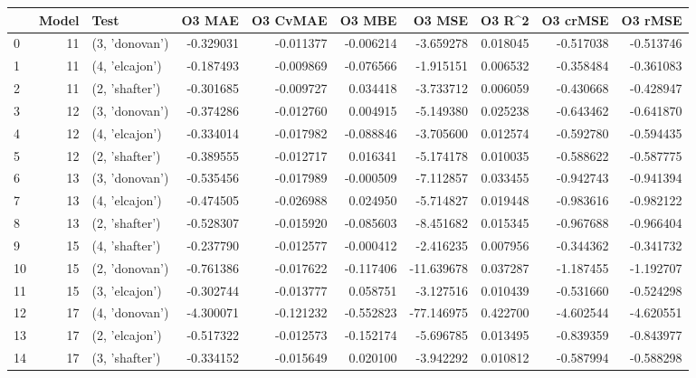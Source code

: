 \begin{tabular}{lrlrrrrrrr}
\toprule
{} &  Model &            Test &    O3 MAE &  O3 CvMAE &    O3 MBE &     O3 MSE &    O3 R\textasciicircum2 &  O3 crMSE &   O3 rMSE \\
\midrule
0  &     11 &  (3, 'donovan') & -0.329031 & -0.011377 & -0.006214 &  -3.659278 &  0.018045 & -0.517038 & -0.513746 \\
1  &     11 &  (4, 'elcajon') & -0.187493 & -0.009869 & -0.076566 &  -1.915151 &  0.006532 & -0.358484 & -0.361083 \\
2  &     11 &  (2, 'shafter') & -0.301685 & -0.009727 &  0.034418 &  -3.733712 &  0.006059 & -0.430668 & -0.428947 \\
3  &     12 &  (3, 'donovan') & -0.374286 & -0.012760 &  0.004915 &  -5.149380 &  0.025238 & -0.643462 & -0.641870 \\
4  &     12 &  (4, 'elcajon') & -0.334014 & -0.017982 & -0.088846 &  -3.705600 &  0.012574 & -0.592780 & -0.594435 \\
5  &     12 &  (2, 'shafter') & -0.389555 & -0.012717 &  0.016341 &  -5.174178 &  0.010035 & -0.588622 & -0.587775 \\
6  &     13 &  (3, 'donovan') & -0.535456 & -0.017989 & -0.000509 &  -7.112857 &  0.033455 & -0.942743 & -0.941394 \\
7  &     13 &  (4, 'elcajon') & -0.474505 & -0.026988 &  0.024950 &  -5.714827 &  0.019448 & -0.983616 & -0.982122 \\
8  &     13 &  (2, 'shafter') & -0.528307 & -0.015920 & -0.085603 &  -8.451682 &  0.015345 & -0.967688 & -0.966404 \\
9  &     15 &  (4, 'shafter') & -0.237790 & -0.012577 & -0.000412 &  -2.416235 &  0.007956 & -0.344362 & -0.341732 \\
10 &     15 &  (2, 'donovan') & -0.761386 & -0.017622 & -0.117406 & -11.639678 &  0.037287 & -1.187455 & -1.192707 \\
11 &     15 &  (3, 'elcajon') & -0.302744 & -0.013777 &  0.058751 &  -3.127516 &  0.010439 & -0.531660 & -0.524298 \\
12 &     17 &  (4, 'donovan') & -4.300071 & -0.121232 & -0.552823 & -77.146975 &  0.422700 & -4.602544 & -4.620551 \\
13 &     17 &  (2, 'elcajon') & -0.517322 & -0.012573 & -0.152174 &  -5.696785 &  0.013495 & -0.839359 & -0.843977 \\
14 &     17 &  (3, 'shafter') & -0.334152 & -0.015649 &  0.020100 &  -3.942292 &  0.010812 & -0.587994 & -0.588298 \\

\end{tabular}

